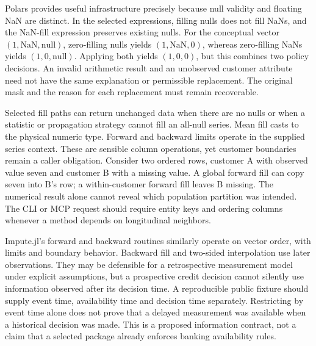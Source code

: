 Polars provides useful infrastructure precisely because null validity and floating NaN are distinct. In the selected expressions, filling nulls does not fill NaNs, and the NaN-fill expression preserves existing nulls. For the conceptual vector $(1,\mathrm{NaN},\mathrm{null})$, zero-filling nulls yields $(1,\mathrm{NaN},0)$, whereas zero-filling NaNs yields $(1,0,\mathrm{null})$. Applying both yields $(1,0,0)$, but this combines two policy decisions. An invalid arithmetic result and an unobserved customer attribute need not have the same explanation or permissible replacement. The original mask and the reason for each replacement must remain recoverable.~\citep{exec25_otm_polars,exec25_otm_choice}

Selected fill paths can return unchanged data when there are no nulls or when a statistic or propagation strategy cannot fill an all-null series. Mean fill casts to the physical numeric type. Forward and backward limits operate in the supplied series context. These are sensible column operations, yet customer boundaries remain a caller obligation. Consider two ordered rows, customer A with observed value seven and customer B with a missing value. A global forward fill can copy seven into B's row; a within-customer forward fill leaves B missing. The numerical result alone cannot reveal which population partition was intended. The CLI or MCP request should require entity keys and ordering columns whenever a method depends on longitudinal neighbors.~\citep{exec25_otm_polars,exec25_otm_choice}

Impute.jl's forward and backward routines similarly operate on vector order, with limits and boundary behavior. Backward fill and two-sided interpolation use later observations. They may be defensible for a retrospective measurement model under explicit assumptions, but a prospective credit decision cannot silently use information observed after its decision time. A reproducible public fixture should supply event time, availability time and decision time separately. Restricting by event time alone does not prove that a delayed measurement was available when a historical decision was made. This is a proposed information contract, not a claim that a selected package already enforces banking availability rules.~\citep{exec25_otm_imputejl,exec25_otm_choice}

